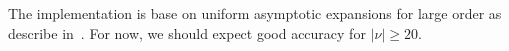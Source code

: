 \documentclass[12pt,a4paper]{article}
\numberwithin{equation}{section}
\newcommand{\ex}{\mathsf{e}}
\newcommand{\im}{\mathsf{i}\mkern1mu}
\newcommand{\abs}[1]{\left\lvert#1\right\rvert}
\theoremstyle{definition}
\theoremstyle{plain}
\theoremstyle{remark}
\begin{document}
The implementation is base on uniform asymptotic expansions for large order as describe in~\cite{Tem97}.
For now, we should expect good accuracy for \( \abs{\nu} \geq 20 \).



\end{document}
